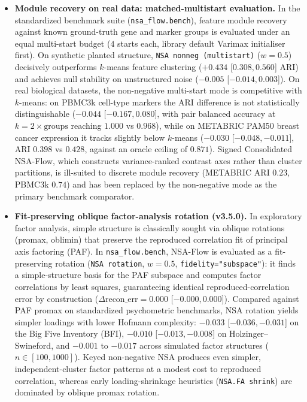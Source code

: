 \documentclass[11pt]{article}
\theoremstyle{definition}
\begin{document}
\begin{itemize}
  (10 outer splits) no method differs from tuned PCA. The ADNI effect is the one
  result that survives; it is modest, from one cohort, and its split-to-split
  SD is $0.19$--$0.29$.
\item \textbf{Module recovery on real data: matched-multistart evaluation.}
  In the standardized benchmark suite (\texttt{nsa\_flow.bench}), feature module recovery against known ground-truth gene and marker groups is evaluated under an equal multi-start budget ($4$ starts each, library default Varimax initialiser first). On synthetic planted structure, \texttt{NSA nonneg (multistart)} ($w=0.5$) decisively outperforms $k$-means feature clustering ($+0.434$ [$0.308, 0.560$] ARI) and achieves null stability on unstructured noise ($-0.005$ [$-0.014, 0.003$]). On real biological datasets, the non-negative multi-start mode is competitive with $k$-means: on PBMC3k cell-type markers the ARI difference is not statistically distinguishable ($-0.044$ [$-0.167, 0.080$], with pair balanced accuracy at $k = 2 \times \text{groups}$ reaching $1.000$ vs $0.968$), while on METABRIC PAM50 breast cancer expression it tracks slightly below $k$-means ($-0.030$ [$-0.048, -0.011$], ARI $0.398$ vs $0.428$, against an oracle ceiling of $0.871$). Signed Consolidated NSA-Flow, which constructs variance-ranked contrast axes rather than cluster partitions, is ill-suited to discrete module recovery (METABRIC ARI $0.23$, PBMC3k $0.74$) and has been replaced by the non-negative mode as the primary benchmark comparator.
\item \textbf{Fit-preserving oblique factor-analysis rotation (v3.5.0).}
  In exploratory factor analysis, simple structure is classically sought via oblique rotations (promax, oblimin) that preserve the reproduced correlation fit of principal axis factoring (PAF). In \texttt{nsa\_flow.bench}, NSA-Flow is evaluated as a fit-preserving rotation (\texttt{NSA rotation}, $w=0.5$, \texttt{fidelity="subspace"}): it finds a simple-structure basis for the PAF subspace and computes factor correlations by least squares, guaranteeing identical reproduced-correlation error by construction ($\Delta \text{recon\_err} = 0.000$ [$-0.000, 0.000$]). Compared against PAF promax on standardized psychometric benchmarks, NSA rotation yields simpler loadings with lower Hofmann complexity: $-0.033$ [$-0.036, -0.031$] on the Big Five Inventory (BFI), $-0.010$ [$-0.013, -0.008$] on Holzinger--Swineford, and $-0.001$ to $-0.017$ across simulated factor structures ($n \in [100, 1000]$). Keyed non-negative NSA produces even simpler, independent-cluster factor patterns at a modest cost to reproduced correlation, whereas early loading-shrinkage heuristics (\texttt{NSA.FA shrink}) are dominated by oblique promax rotation.

\end{itemize}
\end{document}
